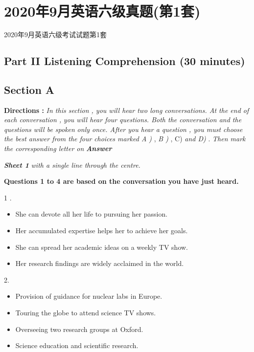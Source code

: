 \documentclass[UTF8,11pt]{ctexart}
\begin{document}
\section*{2020年9月英语六级真题(第1套)}
2020年9月英语六级考试试题第1套


\subsection*{\textbf{Part II} \textbf{Listening Comprehension} \textbf{(30 minutes)}}


\subsection*{\textbf{Section A}}


\textbf{Directions : }\textit{In this section , you will hear two long conversations. At the end of each conversation ,} \textit{you will hear four questions. Both the conversation and the questions will be spoken} \textit{only once. After you hear a question , you must choose the best answer from the four} \textit{choices marked A ) }, \textit{B ) }, C) \textit{and D) }. \textit{Then mark the corresponding letter on }\textbf{\textit{Answer}}


\textbf{\textit{Sheet 1 }}\textit{with a single line through the centre.}


\textbf{Questions 1 to 4 are based on the conversation you have just heard.}


1 .


\begin{itemize}[leftmargin=2em,itemsep=.2em,topsep=.4em]\item[A.] She can devote all her life to pursuing her passion.
\item[B.] Her accumulated expertise helps her to achieve her goals.
\item[C.] She can spread her academic ideas on a weekly TV show.
\item[D.] Her research findings are widely acclaimed in the world.
\end{itemize}

2.


\begin{itemize}[leftmargin=2em,itemsep=.2em,topsep=.4em]\item[A.] Provision of guidance for nuclear labs in Europe.
\item[B.] Touring the globe to attend science TV shows.
\item[C.] Overseeing two research groups at Oxford.
\item[D.] Science education and scientific research.
\end{itemize}
\end{document}
